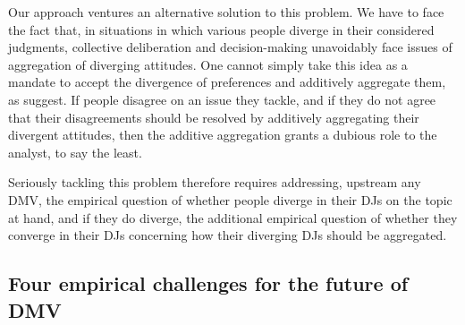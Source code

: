 \documentclass[version=3.21, pagesize, twoside=off, bibliography=totoc, DIV=calc, fontsize=12pt, a4paper, french, english]{scrartcl}
\begin{document}
Our approach ventures an alternative solution to this problem. We have to face the fact that, in situations in which various people diverge in their considered judgments, collective deliberation and decision-making unavoidably face issues of aggregation of diverging attitudes. 
One cannot simply take this idea as a mandate to accept the divergence of preferences and additively aggregate them, as \citet{bartkowski_beyond_2018} suggest. If people disagree on an issue they tackle, and if they do not agree that their disagreements should be resolved by additively aggregating their divergent attitudes, then the additive aggregation grants a dubious role to the analyst, to say the least.

Seriously tackling this problem therefore requires addressing, upstream any DMV, the empirical question of whether people diverge in their \acp{DJ} on the topic at hand, and if they do diverge, the additional empirical question of whether they converge in their \acp{DJ} concerning how their diverging \acp{DJ} should be aggregated. 

\subsection{Four empirical challenges for the future of DMV}
\end{document}
